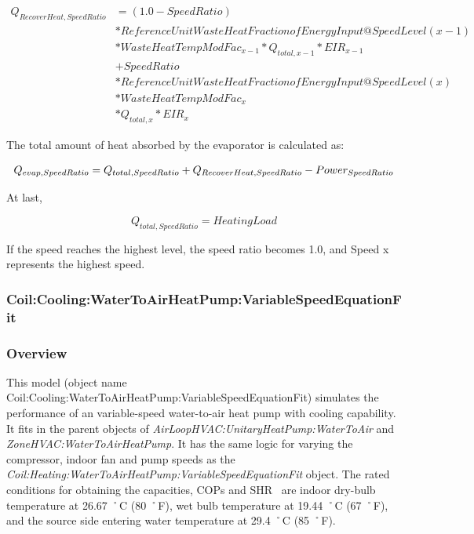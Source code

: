\begin{equation}
  \begin{array}{rl}
    Q_{RecoverHeat,SpeedRatio} &= \left( 1.0 - SpeedRatio \right) \\
                               &* ReferenceUnitWasteHeatFractionofEnergyInput@SpeedLevel\left( {x - 1} \right) \\
                               &* WasteHeatTempModFac_{x - 1} * Q_{total,x - 1} * EIR_{x - 1} \\
                               &+ SpeedRatio \\
                               &* ReferenceUnitWasteHeatFractionofEnergyInput@SpeedLevel\left( x \right) \\
                               &* WasteHeatTempModFac_x \\
                               &* Q_{total,x} * EIR_x
  \end{array}
\end{equation}

The total amount of heat absorbed by the evaporator is calculated as:

\begin{equation}
{Q_{evap,SpeedRatio}} = {Q_{total,SpeedRatio}} + {\rm{}}{Q_{RecoverHeat,SpeedRatio}} - Powe{r_{SpeedRatio}}
\end{equation}

At last,

\begin{equation}
{Q_{total,SpeedRatio}} = HeatingLoad
\end{equation}

If the speed reaches the highest level, the speed ratio becomes 1.0, and Speed x represents the highest speed.

\subsubsection{Coil:Cooling:WaterToAirHeatPump:VariableSpeedEquationFit}\label{coilcoolingwatertoairheatpumpvariablespeedequationfit}

\subsubsection{Overview}\label{overview-14}

This model (object name Coil:Cooling:WaterToAirHeatPump:VariableSpeedEquationFit) simulates the performance of an variable-speed water-to-air heat pump with cooling capability. It fits in the parent objects of \emph{AirLoopHVAC:UnitaryHeatPump:WaterToAir} and \emph{ZoneHVAC:WaterToAirHeatPump}. It has the same logic for varying the compressor, indoor fan and pump speeds as the \emph{Coil:Heating:WaterToAirHeatPump:VariableSpeedEquationFit} object. The rated conditions for obtaining the capacities, COPs and SHR~ are indoor dry-bulb temperature at 26.67 ˚C (80 ˚F), wet bulb temperature at 19.44 ˚C (67 ˚F),~ and the source side entering water temperature at 29.4 ˚C (85 ˚F).

